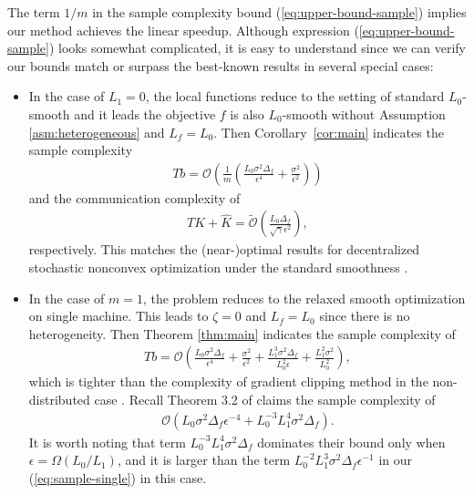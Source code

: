 \documentclass[sigconf]{acmart}
\def\fO{{\mathcal{O}}}
\theoremstyle{plain}
\begin{document}
The term $1/m$ in the sample complexity bound (\ref{eq:upper-bound-sample}) implies our method achieves the linear speedup. 
Although expression (\ref{eq:upper-bound-sample}) looks somewhat complicated, it is easy to understand since we can verify our bounds match or surpass the best-known results in several special cases:
\begin{itemize}[topsep=-4pt,itemsep=1.5pt,partopsep=1.8pt, parsep=1.8pt,leftmargin=0.65cm]   
    \item In the case of $L_1=0$, the local functions reduce to the setting of standard $L_0$-smooth and it leads the objective $f$ is also $L_0$-smooth without Assumption \ref{asm:heterogeneous} and $L_f=L_0$. Then Corollary~\ref{cor:main} indicates the sample complexity 
    \begin{align*}
       Tb=\fO\left(\frac{1}{m}\left(\frac{L_0\sigma^2\Delta_f}{\epsilon^4} + \frac{\sigma^2}{\epsilon^2}\right)\right) 
    \end{align*}
    and the communication complexity of
    \begin{align*}
        TK+\hat K = \tilde\fO\left(\frac{L_0\Delta_f}{\sqrt{\gamma}\epsilon^2}\right),
    \end{align*}
    respectively. This matches the (near-)optimal results for decentralized stochastic nonconvex optimization under the standard smoothness \cite[Corollary~1]{lu2021optimal}.
    \item In the case of $m=1$, the problem reduces to the relaxed smooth optimization on single machine. This leads to $\zeta=0$ and $L_f=L_0$ since there is no heterogeneity.
    Then Theorem \ref{thm:main} indicates the sample complexity of
    \begin{align}\label{eq:sample-single}
        Tb = \fO\left(\frac{L_0\sigma^2\Delta_f}{\epsilon^4} + \frac{\sigma^2}{\epsilon^2} + \frac{L_1^3\sigma^2\Delta_f}{L_0^2 \epsilon} + \frac{L_1^2\sigma^2}{L_0^2} \right), 
    \end{align}
    which is tighter than the complexity of gradient clipping method in the non-distributed case \citep{zhang2020improved}. Recall Theorem 3.2 of \citet{zhang2020improved} claims the sample complexity of 
    \begin{align*}
    \fO(L_0\sigma^2\Delta_f\epsilon^{-4} + L_0^{-3}L_1^4\sigma^2\Delta_f).    
    \end{align*}
    It is worth noting that term $L_0^{-3}L_1^4\sigma^2\Delta_f$ dominates their bound only when $\epsilon=\Omega(L_0/L_1)$, and it is larger than the term $L_0^{-2}L_1^3\sigma^2\Delta_f\epsilon^{-1}$ in our (\ref{eq:sample-single}) in this case.

\end{itemize}
\end{document}
